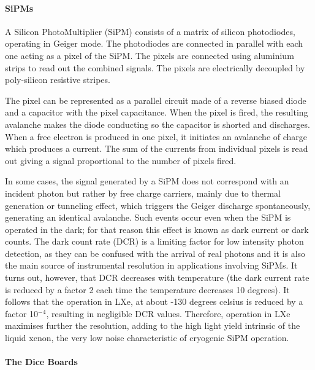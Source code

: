 \paragraph{SiPMs}

A Silicon PhotoMultiplier (SiPM) consists of a matrix of silicon photodiodes, operating in Geiger mode. The photodiodes are connected in parallel with each one acting as a pixel of the SiPM. The pixels are connected using aluminium strips to read out the combined signals. The pixels are electrically decoupled by poly-silicon resistive stripes.

 The pixel can be represented as a parallel circuit made of a reverse biased diode and a capacitor with the pixel capacitance. When the pixel is fired, the resulting avalanche makes the diode conducting so the capacitor is shorted and discharges.
When a free electron is produced in one pixel, it initiates an avalanche of charge which produces a current. The sum of the currents from individual pixels is read out giving a signal proportional to the number of pixels fired.

In some cases, the signal generated by a SiPM does not correspond with an incident photon but rather by free charge carriers, mainly due to thermal generation or tunneling effect, which triggers the Geiger discharge spontaneously, generating an identical avalanche. Such events occur even when the SiPM is operated in the dark; for that reason this effect is known as dark current or dark counts. The dark count rate (DCR) is a limiting factor for low intensity photon detection, as they can be confused with the arrival of real photons and it is also the main source of instrumental resolution in applications involving SiPMs. It turns out, however, that DCR decreases with temperature (the dark current rate is reduced by a factor 2 each time the temperature decreases 10 degrees). It follows that the operation in LXe, at about -130 degrees celsius is reduced by a factor 10$^{-4}$, resulting in negligible DCR values. 
Therefore, operation in LXe maximises further the resolution, adding to the high light yield intrinsic of the liquid xenon, the very low noise characteristic of cryogenic SiPM operation. 

\paragraph{The Dice Boards}
\label{sec.dc}


